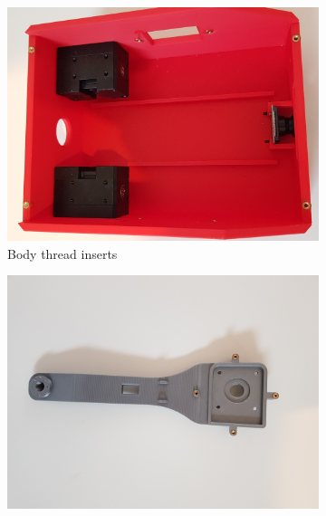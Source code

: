 \newpage
\begin{figure}[h]
	\centering
	\begin{subfigure}[t]{0.3\textwidth}
		\centering
		\includegraphics[height=0.7\textwidth]{body_thread_inserts}
		\caption{Body thread inserts}
		\label{fig:bodythreadinserts}
	\end{subfigure}
	\begin{subfigure}[t]{0.3\textwidth}
		\centering
		\includegraphics[height=0.7\textwidth]{knee_wheel_link_thread_inserts}

\end{subfigure}
\end{figure}
